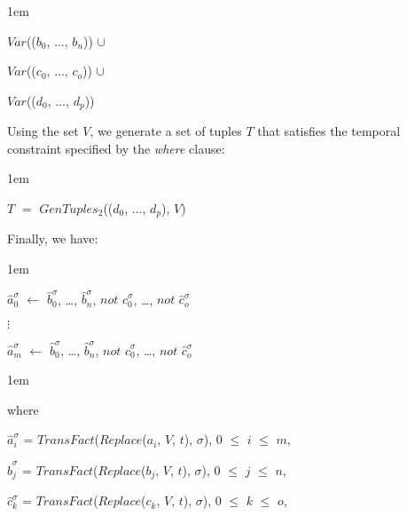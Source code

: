 \documentclass[11pt]{report}
\newenvironment{vquote}
{
  \begin{list}{}{\leftmargin 1em}\item[]
}
{
  \end{list}
}
\begin{document}
\begin{itemize}
\begin{vquote}
                \hspace{1em}
                $Var$(($b_0$, $\ldots$, $b_n$)) $\cup$

                \hspace{1em}
                $Var$(($c_0$, $\ldots$, $c_o$)) $\cup$

                \hspace{1em}
                $Var$(($d_0$, $\ldots$, $d_p$))
              \end{vquote}

              \noindent
              Using the set $V$, we generate a set of tuples $T$ that satisfies
              the temporal constraint specified by the {\em where} clause:

              \begin{vquote}
                $T$ $=$ $GenTuples_2$(($d_0$, $\ldots$, $d_p$), $V$)
              \end{vquote}

              \noindent
              Finally, we have:

              \begin{vquote}
                $\hat{a}^{\sigma}_{0}$ $\leftarrow$
                $\hat{b}^{\sigma}_{0}$, \ldots, $\hat{b}^{\sigma}_{n}$,
                $not$ $\hat{c}^{\sigma}_{0}$, \ldots, $not$ $\hat{c}^{\sigma}_{o}$

                $\vdots$

                $\hat{a}^{\sigma}_{m}$ $\leftarrow$
                $\hat{b}^{\sigma}_{0}$, \ldots, $\hat{b}^{\sigma}_{n}$,
                $not$ $\hat{c}^{\sigma}_{0}$, \ldots, $not$ $\hat{c}^{\sigma}_{o}$
              \end{vquote}

              \begin{vquote}
                where

                \hspace{1em}
                $\hat{a}^{\sigma}_{i}$ = $TransFact$($Replace$($a_{i}$, $V$, $t$), $\sigma$),
                $0$ $\leq$ $i$ $\leq$ $m$,
    
                \hspace{1em}
                $\hat{b}^{\sigma}_{j}$ = $TransFact$($Replace$($b_{j}$, $V$, $t$), $\sigma$),
                $0$ $\leq$ $j$ $\leq$ $n$,
    
                \hspace{1em}
                $\hat{c}^{\sigma}_{k}$ = $TransFact$($Replace$($c_{k}$, $V$, $t$), $\sigma$),
                $0$ $\leq$ $k$ $\leq$ $o$,
    

\end{vquote}
\end{itemize}
\end{document}
